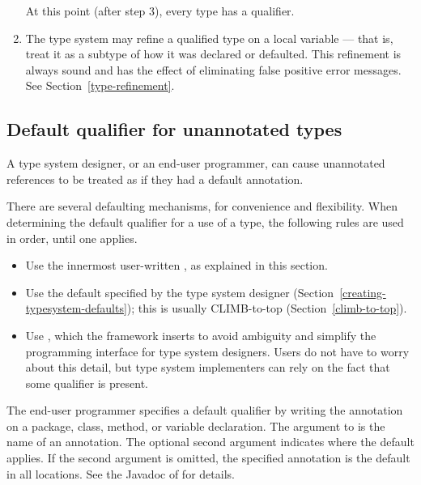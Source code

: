 \begin{enumerate}
  \smallskip

  At this point (after step 3), every type has a qualifier.

\item
  The type system may refine a qualified type on a local variable --- that
  is, treat it as a subtype of how it was declared or defaulted.  This
  refinement is always sound and has the effect of eliminating false
  positive error messages.  See Section~\ref{type-refinement}.


\end{enumerate}



\subsection{Default qualifier for unannotated types\label{defaults}}

A type system designer, or an end-user programmer, can cause unannotated
references to be treated as if they had a default annotation.

There are several defaulting mechanisms, for convenience and flexibility.
When determining the default qualifier for a use of a type, the following
rules are used in order, until one applies.
\begin{itemize}
\item
  Use the innermost user-written , as explained in
  this section.
\item
  Use the default specified by the type system designer
  (Section~\ref{creating-typesystem-defaults});
  this is usually CLIMB-to-top (Section~\ref{climb-to-top}).
\item
  Use , which the framework
  inserts to avoid ambiguity and simplify the programming interface for
  type system designers.  Users do not have to worry about this detail,
  but type system implementers can rely on the fact that some
  qualifier is present.
\end{itemize}



The end-user programmer specifies a default qualifier by writing the 
annotation on a package, class, method, or variable declaration.  The
argument to  is the 
name of an annotation.
The optional second argument indicates where the default
applies.  If the second argument is omitted, the specified annotation is
the default in all locations.  See the Javadoc of  for details.

